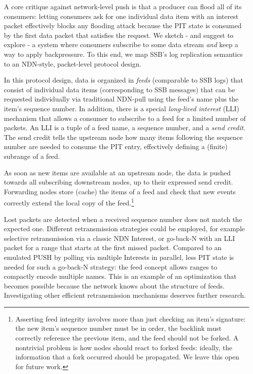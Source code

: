 \documentclass[9pt,sigconf]{acmart}
\begin{document}
A core critique against network-level push is that a producer can
flood all of its consumers: letting consumers ask for one individual
data item with an interest packet effectively blocks any flooding
attack because the PIT state is consumed by the first data packet that
satisfies the request. We sketch - and suggest to explore - a
system where consumers subscribe to some data stream {\em and} keep a
way to apply backpressure. To this end, we map SSB's log replication semantics
to an NDN-style, packet-level protocol design.

In this protocol design, data is organized in \textit{feeds} (comparable to SSB logs) that consist of individual data items (corresponding to SSB messages) that can be requested individually via traditional NDN-pull using the feed's name plus the item's sequence number.
In addition, there is a special \textit{long-lived interest} (LLI) mechanism that allows a consumer to subscribe to a feed for a limited number of packets. An LLI is a tuple of a feed name, a sequence number, and a \textit{send credit}.
The send credit tells the upstream node how many items
following the sequence number are needed to consume the PIT entry, effectively defining a (finite) subrange of a feed.

As soon as new items are available at an upstream node, the data is pushed
towards all subscribing downstream nodes, up to their expressed send
credit. Forwarding nodes store (cache) the items of a feed and check
that new events correctly extend the local copy of the feed.\footnote{
  Asserting feed integrity involves more than just checking an item's
  signature: the new item's sequence number must be in order, the
  backlink must correctly reference the previous item, and the feed
  should not be forked. A nontrivial problem is how nodes should react
  to forked feeds: ideally, the information that a fork occurred should be
  propagated. We leave this open for future work.}

Lost packets are detected when a received sequence number does not
match the expected one. Different retransmission strategies could be
employed, for example selective retransmission via a classic NDN
Interest, or go-back-N with an LLI packet for a range that starts at
the first missed packet. Compared to an emulated PUSH by polling via
multiple Interests in parallel, less PIT state is needed for such a
go-back-N strategy: the feed concept allows ranges to compactly encode
multiple names. This is an
example of an optimization that becomes possible because the network
knows about the structure of feeds. Investigating other efficient
retransmission mechanisms deserves further research.
\end{document}
